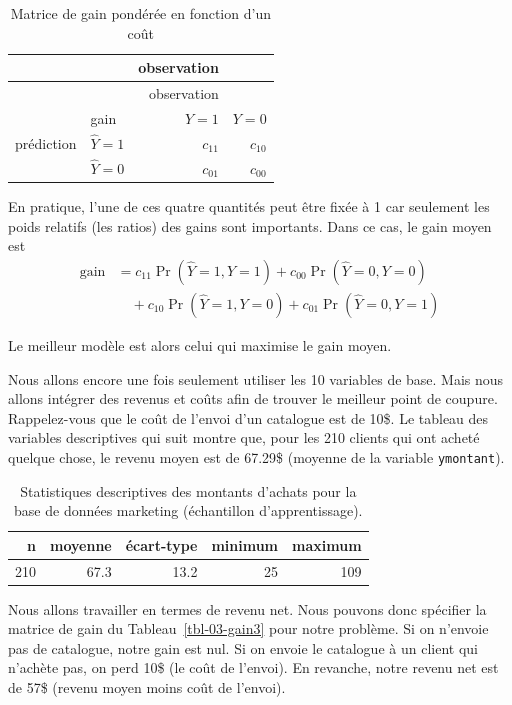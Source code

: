\documentclass[
  11pt,
  letterpaper,
]{scrbook}
\theoremstyle{definition}
\theoremstyle{remark}
\begin{document}
\hypertarget{tbl-03-gain2}{}
\begin{longtable}[]{@{}llrr@{}}
\caption{\label{tbl-03-gain2}Matrice de gain pondérée en fonction d'un
coût}\tabularnewline
\toprule()
& & observation & \\
\midrule()
\endfirsthead
\toprule()
& & observation & \\
\midrule()
\endhead
& gain & \(Y=1\) & \(Y=0\) \\
prédiction & \(\widehat{Y}=1\) & \(c_{11}\) & \(c_{10}\) \\
& \(\widehat{Y}=0\) & \(c_{01}\) & \(c_{00}\) \\
\bottomrule()
\end{longtable}

En pratique, l'une de ces quatre quantités peut être fixée à 1 car
seulement les poids relatifs (les ratios) des gains sont importants.
Dans ce cas, le gain moyen est \begin{align*}
\text{gain} &= c_{11} \Pr(\widehat{Y}=1, Y=1) + c_{00}\Pr(\widehat{Y}=0, Y=0) 
\\ &\quad + c_{10} \Pr(\widehat{Y}=1, Y=0)  + c_{01} \Pr(\widehat{Y}=0, Y=1)
\end{align*}

Le meilleur modèle est alors celui qui maximise le gain moyen.

Nous allons encore une fois seulement utiliser les 10 variables de base.
Mais nous allons intégrer des revenus et coûts afin de trouver le
meilleur point de coupure. Rappelez-vous que le coût de l'envoi d'un
catalogue est de 10\$. Le tableau des variables descriptives qui suit
montre que, pour les 210 clients qui ont acheté quelque chose, le revenu
moyen est de 67.29\$ (moyenne de la variable \texttt{ymontant}).

\hypertarget{tbl-dbm-ymontant-apprentissage}{}
\begin{table}
\caption{\label{tbl-dbm-ymontant-apprentissage}Statistiques descriptives des montants d'achats pour la base de données
marketing (échantillon d'apprentissage). }\tabularnewline

\centering
\begin{tabular}{rrrrr}
\toprule
n & moyenne & écart-type & minimum & maximum\\
\midrule
210 & 67.3 & 13.2 & 25 & 109\\
\bottomrule
\end{tabular}
\end{table}

Nous allons travailler en termes de revenu net. Nous pouvons donc
spécifier la matrice de gain du Tableau~\ref{tbl-03-gain3} pour notre
problème. Si on n'envoie pas de catalogue, notre gain est nul. Si on
envoie le catalogue à un client qui n'achète pas, on perd 10\$ (le coût
de l'envoi). En revanche, notre revenu net est de 57\$ (revenu moyen
moins coût de l'envoi).
\end{document}
